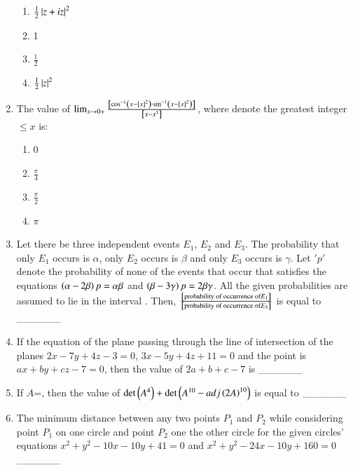 \documentclass[journal]{IEEEtran}
\begin{document}
\begin{enumerate}
\begin{enumerate}
     \item $\frac{1}{2}\left\vert z+iz\right\vert^2$
     \item 1
     \item $\frac{1}{2}$
     \item $\frac{1}{2}\left\vert z\right\vert^2$\\
 \end{enumerate}
\item The value of $\lim_{x\rightarrow 0+} \frac{{}\left[\cos^{-1}\left(x - {}\left[x\right]^2\right)\cdot\sin^{-1}\left(x - {}\left[x\right]^2\right)\right]}{{}\left[x - x^3\right]}$, where  denote the greatest integer $\leq x$ is:
\begin{enumerate}
    \item 0
    \item $\frac{\pi}{4}$
    \item $\frac{\pi}{2}$
    \item $\pi$\\
\end{enumerate}
\item  Let there be three independent events $E_1$, $E_2$ and $E_3$. The probability that only $E_1$ occurs is $\alpha$, only $E_2$ occurs is $\beta$ and only $E_3$ occurs is $\gamma$. Let $'p'$ denote the probability of none of the events that occur that satisfies the equations $\left(\alpha - 2\beta\right)p = \alpha\beta$ and $\left(\beta - 3\gamma\right)p = 2\beta\gamma$. All the given probabilities are assumed to lie in the interval . Then, $\frac{{}\left[\text{probability of occurrence of} E_1\right]}{{}\left[\text{probability of occurrence of} E_3\right]}$ is equal to \_\_\_\_\_\_  \\
\item If the equation of the plane passing through the line of intersection of the planes $2x - 7y + 4z - 3 = 0$, $3x - 5y + 4z + 11 = 0$ and the point  is $ax + by + cz - 7 = 0$, then the value of $2a + b + c - 7$ is \_\_\_\_\_\_ \\
\item If $A$=, then the value of $\det{\ensuremath{\left(A^4\right)}} + \det{\ensuremath{\left(A^{10} - adj\left(2A\right)^{10}\right)}}$ is equal to \_\_\_\_\_\_ \\
\item The minimum distance between any two points $P_1$ and $P_2$ while considering point $P_1$ on one circle and point $P_2$ one the other circle for the given circles' equations $x^2 + y^2 - 10x - 10y + 41 = 0$ and $x^2 + y^2 - 24x - 10y + 160 = 0$ \_\_\_\_\_\_ \\

\end{enumerate}
\end{document}
